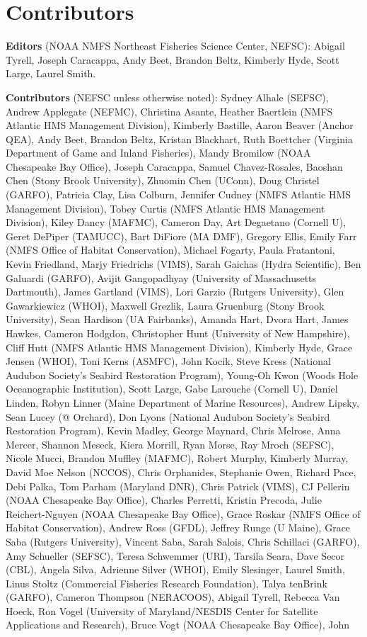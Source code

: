 \documentclass[
  10pt,
]{article}
\begin{document}
\newpage

\section{Contributors}\label{contributors}

\textbf{Editors} (NOAA NMFS Northeast Fisheries Science Center, NEFSC): Abigail Tyrell, Joseph Caracappa, Andy Beet, Brandon Beltz, Kimberly Hyde, Scott Large, Laurel Smith.

\textbf{Contributors} (NEFSC unless otherwise noted): Sydney Alhale (SEFSC), Andrew Applegate (NEFMC), Christina Asante, Heather Baertlein (NMFS Atlantic HMS Management Division), Kimberly Bastille, Aaron Beaver (Anchor QEA), Andy Beet, Brandon Beltz, Kristan Blackhart, Ruth Boettcher (Virginia Department of Game and Inland Fisheries), Mandy Bromilow (NOAA Chesapeake Bay Office), Joseph Caracappa, Samuel Chavez-Rosales, Baoshan Chen (Stony Brook University), Zhuomin Chen (UConn), Doug Christel (GARFO), Patricia Clay, Lisa Colburn, Jennifer Cudney (NMFS Atlantic HMS Management Division), Tobey Curtis (NMFS Atlantic HMS Management Division), Kiley Dancy (MAFMC), Cameron Day, Art Degaetano (Cornell U), Geret DePiper (TAMUCC), Bart DiFiore (MA DMF), Gregory Ellis, Emily Farr (NMFS Office of Habitat Conservation), Michael Fogarty, Paula Fratantoni, Kevin Friedland, Marjy Friedrichs (VIMS), Sarah Gaichas (Hydra Scientific), Ben Galuardi (GARFO), Avijit Gangopadhyay (University of Massachusetts Dartmouth), James Gartland (VIMS), Lori Garzio (Rutgers University), Glen Gawarkiewicz (WHOI), Maxwell Grezlik, Laura Gruenburg (Stony Brook University), Sean Hardison (UA Fairbanks), Amanda Hart, Dvora Hart, James Hawkes, Cameron Hodgdon, Christopher Hunt (University of New Hampshire), Cliff Hutt (NMFS Atlantic HMS Management Division), Kimberly Hyde, Grace Jensen (WHOI), Toni Kerns (ASMFC), John Kocik, Steve Kress (National Audubon Society's Seabird Restoration Program), Young-Oh Kwon (Woods Hole Oceanographic Institution), Scott Large, Gabe Larouche (Cornell U), Daniel Linden, Robyn Linner (Maine Department of Marine Resources), Andrew Lipsky, Sean Lucey (@ Orchard), Don Lyons (National Audubon Society's Seabird Restoration Program), Kevin Madley, George Maynard, Chris Melrose, Anna Mercer, Shannon Meseck, Kiera Morrill, Ryan Morse, Ray Mroch (SEFSC), Nicole Mucci, Brandon Muffley (MAFMC), Robert Murphy, Kimberly Murray, David Moe Nelson (NCCOS), Chris Orphanides, Stephanie Owen, Richard Pace, Debi Palka, Tom Parham (Maryland DNR), Chris Patrick (VIMS), CJ Pellerin (NOAA Chesapeake Bay Office), Charles Perretti, Kristin Precoda, Julie Reichert-Nguyen (NOAA Chesapeake Bay Office), Grace Roskar (NMFS Office of Habitat Conservation), Andrew Ross (GFDL), Jeffrey Runge (U Maine), Grace Saba (Rutgers University), Vincent Saba, Sarah Salois, Chris Schillaci (GARFO), Amy Schueller (SEFSC), Teresa Schwemmer (URI), Tarsila Seara, Dave Secor (CBL), Angela Silva, Adrienne Silver (WHOI), Emily Slesinger, Laurel Smith, Linus Stoltz (Commercial Fisheries Research Foundation), Talya tenBrink (GARFO), Cameron Thompson (NERACOOS), Abigail Tyrell, Rebecca Van Hoeck, Ron Vogel (University of Maryland/NESDIS Center for Satellite Applications and Research), Bruce Vogt (NOAA Chesapeake Bay Office), John 
\end{document}
